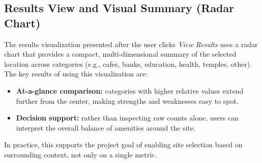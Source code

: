 

\subsection{Results View and Visual Summary (Radar Chart)}
The results visualization presented after the user clicks \textit{View Results} uses a radar chart that provides a compact, multi-dimensional summary of the selected location across categories (e.g., cafes, banks, education, health, temples, other). The key results of using this visualization are:
\begin{itemize}
    \item \textbf{At-a-glance comparison:} categories with higher relative values extend further from the center, making strengths and weaknesses easy to spot.
    \item \textbf{Decision support:} rather than inspecting raw counts alone, users can interpret the overall balance of amenities around the site.
\end{itemize}
In practice, this supports the project goal of enabling site selection based on surrounding context, not only on a single metric.

